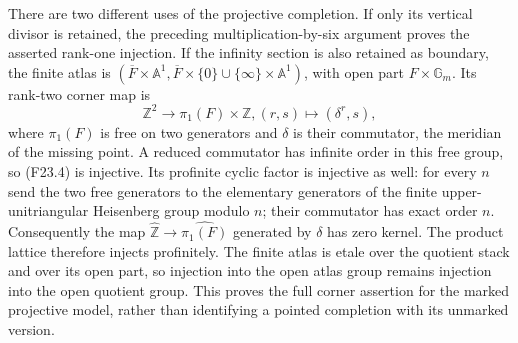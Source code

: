There are two different uses of the projective completion.
If only its vertical divisor is retained, the preceding
multiplication-by-six argument proves the asserted rank-one
injection. If the infinity section is also retained as boundary,
the finite atlas is
$(\overline F\times\mathbb A^1,
  \overline F\times\{0\}\cup\{\infty\}\times\mathbb A^1)$,
with open part $F\times\mathbb G_m$. Its rank-two corner map is
\[
 \mathbb Z^2\longrightarrow \pi_1(F)\times\mathbb Z,
                  (r,s)\longmapsto (\delta^r,s),           \tag{F23.4}
\]
where $\pi_1(F)$ is free on two generators and $\delta$ is their
commutator, the meridian of the missing point. A reduced commutator
has infinite order in this free group, so (F23.4) is injective.
Its profinite cyclic factor is injective as well: for every $n$
send the two free generators to the elementary generators of the
finite upper-unitriangular Heisenberg group modulo $n$; their
commutator has exact order $n$. Consequently the map
$\widehat{\mathbb Z}\to\widehat{\pi_1(F)}$ generated by $\delta$
has zero kernel. The product lattice therefore injects profinitely.
The finite atlas is etale over the quotient stack and over its open
part, so injection into the open atlas group remains injection into
the open quotient group. This proves the full corner assertion for
the marked projective model, rather than identifying a pointed
completion with its unmarked version.
